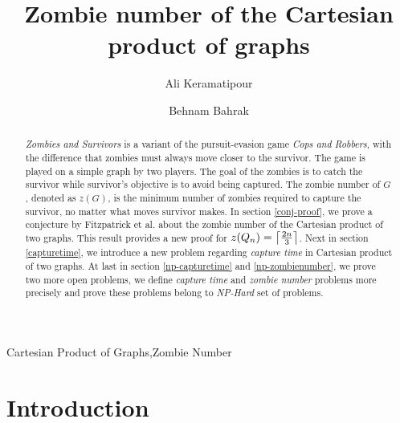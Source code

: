 \documentclass[1p]{elsarticle}
\DeclarePairedDelimiter\ceil{\lceil}{\rceil} \DeclarePairedDelimiter\floor{\lfloor}{\rfloor}
\begin{document}
	
	\begin{frontmatter}
		
		\title{Zombie number of the Cartesian product of graphs}
		
		
		\author{Ali Keramatipour}
		
		\author{Behnam Bahrak}
		
		\address{School of Electrical and Computer Engineering, College of Engineering, University of Tehran, Tehran, Iran}
		
		\begin{abstract}
		{\it Zombies and Survivors} is a variant of the pursuit-evasion game {\it Cops and Robbers}, with the difference
		that zombies must always move closer to the survivor. The game is played on a simple graph by two players. The
		goal of the zombies is to catch the survivor while survivor's objective is to avoid being captured. The zombie
		number of $G$, denoted as $z(G)$, is the minimum number of zombies required to capture the survivor, no matter
		what moves survivor makes. In section \ref{conj-proof}, we prove a conjecture by Fitzpatrick et al.\cite{Fitz16} about the
		zombie number of the Cartesian product of two graphs.  This result provides a new proof for $z(Q_n) =
		\ceil*{\frac{2n}{3}}$. Next in section \ref{capturetime}, we introduce a new problem regarding {\it capture time}
		in Cartesian product of two graphs. At last in section \ref{np-capturetime} and \ref{np-zombienumber}, we prove
		two more open problems, we define {\it capture time} and {\it zombie number} problems more precisely and prove these
		problems belong to {\it NP-Hard} set of problems. 
		\end{abstract}
		
		\begin{keyword}
			Cartesian Product of Graphs\sep Zombie Number
		\end{keyword}
		
	\end{frontmatter}
	
\section{Introduction}\label{section-introduction}
\end{document}
